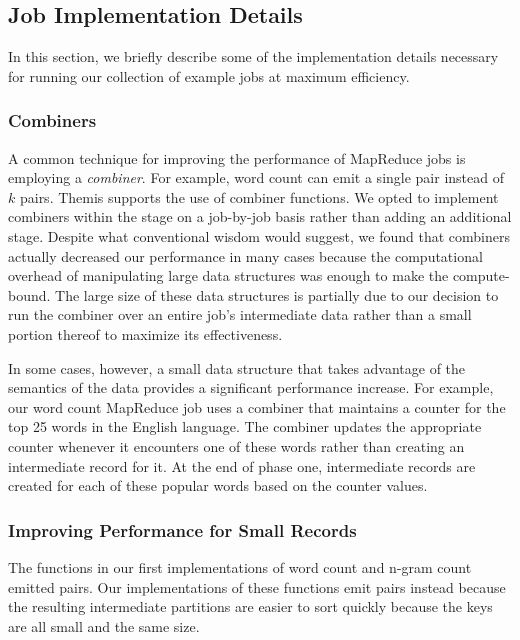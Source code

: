\subsection{Job Implementation Details}

In this section, we briefly describe some of the implementation details
necessary for running our collection of example jobs at maximum efficiency.

\subsubsection{Combiners}

A common technique for improving the performance of
MapReduce jobs is employing a \emph{combiner}. For example, word count can emit
a single  pair instead of $k$ 
pairs. Themis supports the use of combiner functions. We opted to implement
combiners within the \mapper stage on a job-by-job basis rather than adding an
additional stage.  Despite what conventional wisdom would suggest, we found
that combiners actually decreased our performance in many cases
because the computational overhead of manipulating large data structures was
enough to make the \mapper compute-bound. The large size of these data
structures is partially due to our decision to run the combiner over an entire
job's intermediate data rather than a small portion thereof to
maximize its effectiveness.

In some cases, however, a small data structure that takes advantage of the
semantics of the data provides a significant performance increase. For example,
our word count MapReduce job uses a combiner that maintains a counter for the
top 25 words in the English language.  The combiner updates the appropriate
counter whenever it encounters one of these words rather than creating an
intermediate record for it.  At the end of phase one, intermediate records are
created for each of these popular words based on the counter values.

\subsubsection{Improving Performance for Small Records}

The \map functions in our first implementations of word count and n-gram count
emitted  pairs. Our implementations of these \map
functions emit  pairs instead because the resulting
intermediate partitions are easier to sort quickly because the keys are all
small and the same size.


